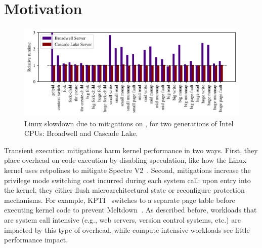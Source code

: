 \section{Motivation}
\label{s:motivation}

\begin{figure}[t]
  \begin{center}
    \includegraphics[width=\textwidth]{results/bhw2_bhw3_overhead}
  \end{center}
\vspace{-\baselineskip}
\caption{Linux slowdown due to mitigations on \bench, for two generations of Intel CPUs: Broadwell and Cascade Lake.}
\label{fig:linuxslowdown}
\end{figure}


Transient execution mitigations harm kernel performance in two
ways. First, they place overhead on code execution by disabling
speculation, like how the Linux kernel uses retpolines to
mitigate Spectre V2~\cite{intel:retpoline}. Second, mitigations
increase the privilege mode switching cost incurred during each system
call: upon entry into the kernel, they either flush microarchitectural
state or reconfigure protection mechanisms.  For example,
KPTI~\cite{gruss:kaiser,linux:kpti} switches to a separate page table
before executing kernel code to prevent Meltdown~\cite{lipp:meltdown}.  As described before, workloads
that are system call intensive (e.g., web servers, version control
systems, etc.) are impacted by this type of overhead, while compute-intensive
workloads see little performance impact.


